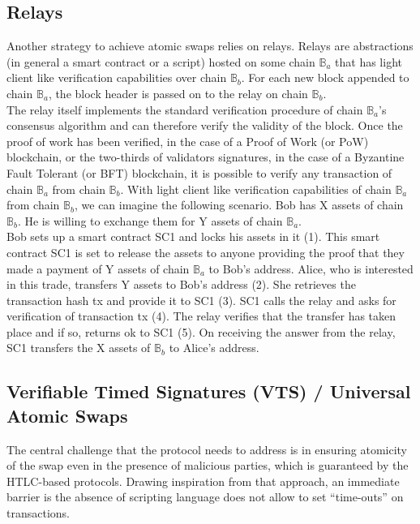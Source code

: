 \documentclass{article}      	%
\begin{document}
\subsection{Relays}
Another strategy to achieve atomic swaps relies on relays. Relays are abstractions (in general a smart contract or a script) hosted on some
chain $\mathbb{B}_a$ that has light client like verification capabilities over chain $\mathbb{B}_b$. For each new block appended to chain $\mathbb{B}_a$,
the block header is passed on to the relay on chain $\mathbb{B}_b$. \\
The relay itself implements the standard verification procedure of chain $\mathbb{B}_a$’s consensus algorithm and can therefore verify the
validity of the block. Once the proof of work has been verified,
in the case of a Proof of Work (or PoW) blockchain, or the
two-thirds of validators signatures, in the case of a Byzantine
Fault Tolerant (or BFT) blockchain, it is possible to verify any
transaction of chain $\mathbb{B}_a$ from chain $\mathbb{B}_b$. With light client
like verification capabilities of chain $\mathbb{B}_a$ from chain $\mathbb{B}_b$,
we can imagine the following scenario. Bob has X assets of
chain $\mathbb{B}_b$. He is willing to exchange them for Y assets of
chain $\mathbb{B}_a$.  \\
    Bob sets up a smart contract SC1 and locks his
assets in it (1). This smart contract SC1 is set to release the
assets to anyone providing the proof that they made a payment
of Y assets of chain $\mathbb{B}_a$ to Bob’s address. Alice, who is
interested in this trade, transfers Y assets to Bob’s address (2).
She retrieves the transaction hash tx and provide it to SC1 (3).
SC1 calls the relay and asks for verification of transaction tx
(4). The relay verifies that the transfer has taken place and if
so, returns ok to SC1 (5). On receiving the answer from the
relay, SC1 transfers the X assets of $\mathbb{B}_b$ to Alice’s address.

\subsection{Verifiable Timed Signatures (VTS) / Universal Atomic Swaps}
The central challenge that the protocol needs to address is in ensuring atomicity of the swap even in the presence of malicious parties, which is guaranteed by the HTLC-based protocols. Drawing inspiration from that approach, an immediate barrier is the absence of scripting language does not allow to set “time-outs” on transactions.
\end{document}
